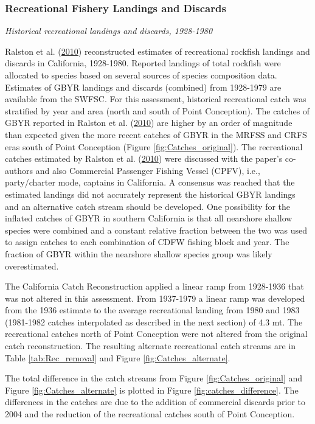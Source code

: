 \documentclass[12pt,]{article}
\begin{document}
\subsubsection{Recreational Fishery Landings and
Discards}\label{recreational-fishery-landings-and-discards}

\emph{Historical recreational landings and discards, 1928-1980}

Ralston et al. (\protect\hyperlink{ref-Ralston2010}{2010}) reconstructed
estimates of recreational rockfish landings and discards in California,
1928-1980. Reported landings of total rockfish were allocated to species
based on several sources of species composition data. Estimates of GBYR
landings and discards (combined) from 1928-1979 are available from the
SWFSC. For this assessment, historical recreational catch was stratified
by year and area (north and south of Point Conception). The catches of
GBYR reported in Ralston et al.
(\protect\hyperlink{ref-Ralston2010}{2010}) are higher by an order of
magnitude than expected given the more recent catches of GBYR in the
MRFSS and CRFS eras south of Point Conception (Figure
\ref{fig:Catches_original}). The recreational catches estimated by
Ralston et al. (\protect\hyperlink{ref-Ralston2010}{2010}) were
discussed with the paper's co-authors and also Commercial Passenger
Fishing Vessel (CPFV), i.e., party/charter mode, captains in California.
A consensus was reached that the estimated landings did not accurately
represent the historical GBYR landings and an alternative catch stream
should be developed. One possibility for the inflated catches of GBYR in
southern California is that all nearshore shallow species were combined
and a constant relative fraction between the two was used to assign
catches to each combination of CDFW fishing block and year. The fraction
of GBYR within the nearshore shallow species group was likely
overestimated.

The California Catch Reconstruction applied a linear ramp from 1928-1936
that was not altered in this assessment. From 1937-1979 a linear ramp
was developed from the 1936 estimate to the average recreational landing
from 1980 and 1983 (1981-1982 catches interpolated as described in the
next section) of 4.3 mt. The recreational catches north of Point
Conception were not altered from the original catch reconstruction. The
resulting alternate recreational catch streams are in Table
\ref{tab:Rec_removal} and Figure \ref{fig:Catches_alternate}.

The total difference in the catch streams from Figure
\ref{fig:Catches_original} and Figure \ref{fig:Catches_alternate} is
plotted in Figure \ref{fig:catches_difference}. The differences in the
catches are due to the addition of commercial discards prior to 2004 and
the reduction of the recreational catches south of Point Conception.
\end{document}
